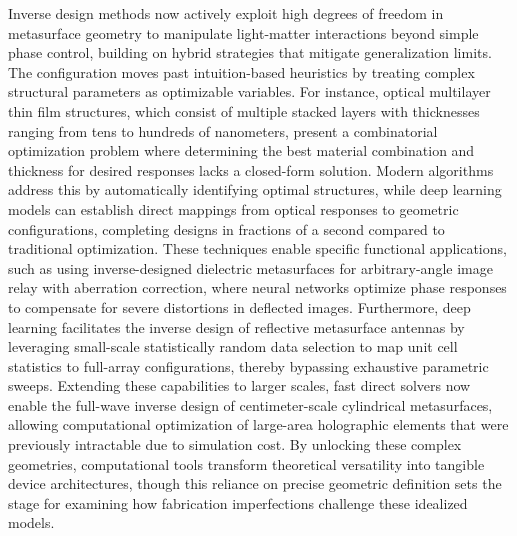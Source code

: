 Inverse design methods now actively exploit high degrees of freedom in metasurface geometry to manipulate light-matter interactions beyond simple phase control, building on hybrid strategies that mitigate generalization limits. The configuration moves past intuition-based heuristics by treating complex structural parameters as optimizable variables. For instance, optical multilayer thin film structures, which consist of multiple stacked layers with thicknesses ranging from tens to hundreds of nanometers, present a combinatorial optimization problem where determining the best material combination and thickness for desired responses lacks a closed-form solution. Modern algorithms address this by automatically identifying optimal structures, while deep learning models can establish direct mappings from optical responses to geometric configurations, completing designs in fractions of a second compared to traditional optimization. These techniques enable specific functional applications, such as using inverse-designed dielectric metasurfaces for arbitrary-angle image relay with aberration correction, where neural networks optimize phase responses to compensate for severe distortions in deflected images. Furthermore, deep learning facilitates the inverse design of reflective metasurface antennas by leveraging small-scale statistically random data selection to map unit cell statistics to full-array configurations, thereby bypassing exhaustive parametric sweeps. Extending these capabilities to larger scales, fast direct solvers now enable the full-wave inverse design of centimeter-scale cylindrical metasurfaces, allowing computational optimization of large-area holographic elements that were previously intractable due to simulation cost. By unlocking these complex geometries, computational tools transform theoretical versatility into tangible device architectures, though this reliance on precise geometric definition sets the stage for examining how fabrication imperfections challenge these idealized models. \citep{doi_10_1016_j_isci_2025_112222_1f7c10f5} \citep{doi_10_1364_oe_519179_39046c11} \citep{doi_10_1002_mop_34068_b2e55b41} \citep{doi_10_1515_nanoph_2024_0127_c4fd5a12}

